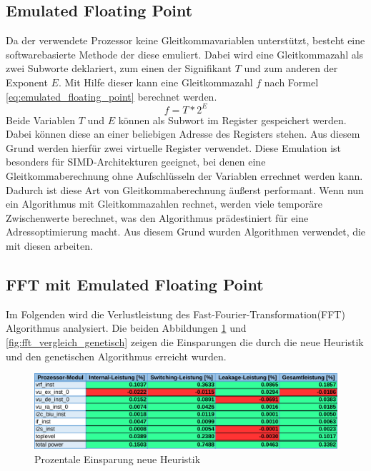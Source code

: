 \subsection{Emulated Floating Point}
\label{chap:emulated_floating_point}
Da der verwendete Prozessor keine Gleitkommavariablen unterstützt, besteht eine softwarebasierte Methode der diese emuliert. Dabei wird eine Gleitkommazahl als zwei Subworte deklariert, zum einen der Signifikant $T$ und zum anderen der Exponent $E$. Mit Hilfe dieser kann eine Gleitkommazahl $f$ nach Formel \ref{eq:emulated_floating_point} berechnet werden.
\begin{equation}
f = T *2^E
\label{eq:emulated_floating_point}
\end{equation}
Beide Variablen $T$ und $E$ können als Subwort im Register gespeichert werden. Dabei können diese an einer beliebigen Adresse des Registers stehen. Aus diesem Grund werden hierfür zwei virtuelle Register verwendet. Diese Emulation ist besonders für SIMD-Architekturen geeignet, bei denen eine Gleitkommaberechnung ohne Aufschlüsseln der Variablen errechnet werden kann. Dadurch ist diese Art von Gleitkommaberechnung äußerst performant.
Wenn nun ein Algorithmus mit Gleitkommazahlen rechnet, werden viele temporäre Zwischenwerte berechnet, was den Algorithmus prädestiniert für eine Adressoptimierung macht. Aus diesem Grund wurden  Algorithmen verwendet, die mit diesen arbeiten. \cite{gerlach2016efficient}

\subsection{FFT mit Emulated Floating Point}
Im Folgenden wird die Verlustleistung des \glqq Fast-Fourier-Transformation\grqq{ }(FFT) Algorithmus analysiert. Die beiden Abbildungen \ref{fig:fft_vergleich_heuristik} und \ref{fig:fft_vergleich_genetisch} zeigen die Einsparungen die durch die neue Heuristik und den genetischen Algorithmus erreicht wurden.

\begin{figure}[H]
	\centering
	\includegraphics[width=\textwidth]{fig/fft_vergleich_heuristik.pdf}
	\caption{Prozentale Einsparung neue Heuristik}
	\label{fig:fft_vergleich_heuristik}
\end{figure}
	
